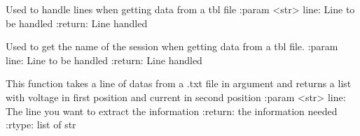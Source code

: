 \documentclass[letterpaper,10pt,english]{sphinxmanual}
\begin{document}

\begin{fulllineitems}
\label{\detokenize{split_data:split_data.converter_split}}
\pysigstartsignatures
{}
\pysigstopsignatures
\sphinxAtStartPar
Used to handle lines when getting data from a tbl file
:param \textless{}str\textgreater{} line: Line to be handled
:return: Line handled

\end{fulllineitems}


\begin{fulllineitems}
\label{\detokenize{split_data:split_data.converter_split_session}}
\pysigstartsignatures
{}
\pysigstopsignatures
\sphinxAtStartPar
Used to get the name of the session when getting data from a tbl file.
:param line: Line to be handled
:return: Line handled

\end{fulllineitems}


\begin{fulllineitems}
\label{\detokenize{split_data:split_data.dataSpliter}}
\pysigstartsignatures
{}
\pysigstopsignatures
\sphinxAtStartPar
This function takes a line of datas from a .txt file in argument and returns a list with voltage in first position and current in second position
:param \textless{}str\textgreater{} line: The line you want to extract the information
:return: the information needed
:rtype: list of str

\end{fulllineitems}

\end{document}
